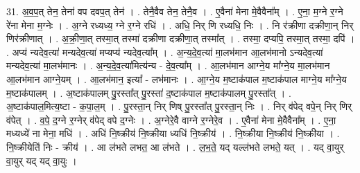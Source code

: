 \documentclass[17pt]{extarticle}
\begin{document}
31. अ॒व॒प॒त् तेन॒ तेना॑ वप दवप॒त् तेन॑ । . तेनै॒वैव तेन॒ तेनै॒व । . ए॒वैना॑ मेना मे॒वैवैना᳚म् । . ए॒ना॒ म॒ग्ने र॒ग्ने रे॑ना मेना म॒ग्नेः । . अ॒ग्ने रध्यध्य॒ ग्ने र॒ग्ने रधि॑ । . अधि॒ निर् णि रध्यधि॒ निः । . नि र॑क्रीणा दक्रीणा॒न् निर् णिर॑क्रीणात् । . अ॒क्री॒णा॒त् तस्मा॒त् तस्मा॑ दक्रीणा दक्रीणा॒त् तस्मा᳚त् । . तस्मा॒ दप्यपि॒ तस्मा॒त् तस्मा॒ दपि॑ । . अप्य॑ न्यदेव॒त्या॑ मन्यदेव॒त्या॑ मप्यप्य॑ न्यदेव॒त्या᳚म् । . अ॒न्य॒दे॒व॒त्या॑ मा॒लभ॑मान आ॒लभ॑मानो ऽन्यदेव॒त्या॑ मन्यदेव॒त्या॑ मा॒लभ॑मानः । . अ॒न्य॒दे॒व॒त्या॑मित्य॑न्य - दे॒व॒त्या᳚म् । . आ॒लभ॑मान आग्ने॒य मा᳚ग्ने॒य मा॒लभ॑मान आ॒लभ॑मान आग्ने॒यम् । . आ॒लभ॑मान॒ इत्या᳚ - लभ॑मानः । . आ॒ग्ने॒य म॒ष्टाक॑पाल म॒ष्टाक॑पाल माग्ने॒य मा᳚ग्ने॒य म॒ष्टाक॑पालम् । . अ॒ष्टाक॑पालम् पु॒रस्ता᳚त् पु॒रस्ता॑ द॒ष्टाक॑पाल म॒ष्टाक॑पालम् पु॒रस्ता᳚त् । . अ॒ष्टाक॑पाल॒मित्य॒ष्टा - क॒पा॒ल॒म् । . पु॒रस्ता॒न् निर् णिष् पु॒रस्ता᳚त् पु॒रस्ता॒न् निः । . निर् व॑पेद् वपे॒न् निर् णिर् व॑पेत् । . व॒पे॒ द॒ग्ने र॒ग्नेर् व॑पेद् वपे द॒ग्नेः । . अ॒ग्नेरे॒वै वाग्ने र॒ग्नेरे॒व । . ए॒वैना॑ मेना मे॒वैवैना᳚म् । . ए॒ना॒ मध्यध्ये॑ ना मेना॒ मधि॑ । . अधि॑ नि॒ष्क्रीय॑ नि॒ष्क्रीया ध्यधि॑ नि॒ष्क्रीय॑ । . नि॒ष्क्रीया नि॒ष्क्रीय॑ नि॒ष्क्रीया । . नि॒ष्क्रीयेति॑ निः - क्रीय॑ । . आ ल॑भते लभत॒ आ ल॑भते । . ल॒भ॒ते॒ यद् यल्ल॑भते लभते॒ यत् । . यद् वा॒युर् वा॒युर् यद् यद् वा॒युः । \newline
\end{document}
